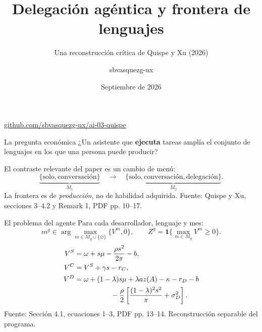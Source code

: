 \documentclass[aspectratio=169,11pt]{beamer}
\title{Delegación agéntica y frontera de lenguajes}
\subtitle{Una reconstrucción crítica de Quispe y Xu (2026)}
\author{sbvasquezg-ux}
\date{Septiembre de 2026}
\newcommand{\source}[1]{\vfill{\color{Gray}\tiny Fuente: #1}}
\newcommand{\key}[1]{{\color{Coral}\bfseries #1}}
\begin{document}
\begin{frame}[plain]
  \vspace{0.7cm}
  {\color{Ink}\LARGE\inserttitle\par}
  \vspace{0.25cm}
  {\Large\color{Blue}\insertsubtitle\par}
  \vfill
  {\large\insertauthor\par}
  \vspace{0.18cm}
  {\small\href{https://github.com/sbvasquezg-ux/ai-03-quispe}{github.com/sbvasquezg-ux/ai-03-quispe}\par}
  \vspace{0.35cm}
  {\small\insertdate\par}
\end{frame}

\begin{frame}{La pregunta económica}
  \Large
  ¿Un asistente que \key{ejecuta} tareas amplía el conjunto de lenguajes en los que una persona puede producir?

  \vspace{0.8cm}
  \normalsize
  El contraste relevante del paper es un cambio de menú:
  \[
  \underbrace{\{\text{solo},\text{conversación}\}}_{M_1}
  \quad\longrightarrow\quad
  \underbrace{\{\text{solo},\text{conversación},\text{delegación}\}}_{M_2}.
  \]
  La frontera es de \emph{producción}, no de habilidad adquirida.
  \source{Quispe y Xu, secciones 3--4.2 y Remark 1, PDF pp. 10--17.}
\end{frame}

\begin{frame}{El problema del agente}
  Para cada desarrollador, lenguaje y mes:
  \[
  m^g\in\arg\max_{m\in M_g\cup\{\varnothing\}}\{V^m,0\},
  \qquad Z^g=\mathbf1\{\max_{m\in M_g}V^m\ge0\}.
  \]
  \small
  \[
  \begin{aligned}
  V^S&=\omega+s\mu-\frac{\rho s^2}{2\pi}-b,\\
  V^C&=V^S+\gamma s-r_C,\\
  V^D&=\omega+(1-\lambda)s\mu+\lambda az(A)-\kappa-r_D-b\\
  &\hspace{1.8cm}-\frac{\rho}{2}\left[\frac{(1-\lambda)^2s^2}{\pi}+\sigma_D^2\right].
  \end{aligned}
  \]
  \source{Sección 4.1, ecuaciones 1--3, PDF pp. 13--14. Reconstrucción separable del programa.}
\end{frame}
\end{document}
